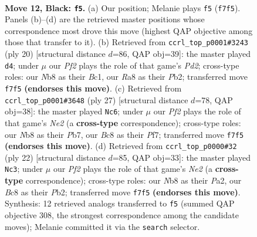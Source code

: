 \documentclass[11pt]{article}
\begin{document}
\clearpage

\begin{figure}[p]\centering
\begin{subfigure}{0.46\textwidth}\centering
\resizebox{\linewidth}{!}{%
\newchessgame
\chessboard[
  setfen={rnb2rk1/2pnqppp/pp2p3/3pP3/3P1P1P/8/PPP1N1P1/1R1QKBNR b - - 3 12},
  showmover=false,
  pgfstyle=straightmove, color=movearrow, markmove={f7-f5}
]}
\caption{}
\end{subfigure}\hfill
\begin{subfigure}{0.46\textwidth}\centering
\resizebox{\linewidth}{!}{%
\newchessgame
\chessboard[
  setfen={r2qk2r/1b1n1ppp/1pp1pn2/p7/P1Q5/R4NP1/1P1PPPBP/2B2RK1 w kq - 0 11},
  showmover=false,
  pgfstyle=straightmove, color=movearrow, markmove={d2-d4}
]}
\caption{}
\end{subfigure}
\\[4pt]
\begin{subfigure}{0.46\textwidth}\centering
\resizebox{\linewidth}{!}{%
\newchessgame
\chessboard[
  setfen={r3r1k1/1ppqnpbp/p2p1np1/8/3PP3/P4N1P/1P1N1PP1/R1BQR1K1 b - - 0 14},
  showmover=false,
  pgfstyle=straightmove, color=movearrow, markmove={e7-c6}
]}
\caption{}
\end{subfigure}\hfill
\begin{subfigure}{0.46\textwidth}\centering
\resizebox{\linewidth}{!}{%
\newchessgame
\chessboard[
  setfen={r1bq1rk1/1p1n1ppp/2pp1n2/p7/2PP4/N5P1/PP1QNPBP/R4RK1 w - - 0 12},
  showmover=false,
  pgfstyle=straightmove, color=movearrow, markmove={e2-c3}
]}
\caption{}
\end{subfigure}
\caption{\textbf{Move 12, Black: \texttt{f5}.} (a) Our position; Melanie plays \texttt{f5} (\texttt{f7f5}). Panels (b)--(d) are the retrieved master positions whose correspondence most drove this move (highest QAP objective among those that transfer to it). (b) Retrieved from \texttt{ccrl\_top\_p0001\#3243} (ply 20) [structural distance $d$=86, QAP obj=39]: the master played \texttt{d4}; under $\mu$ our \emph{Pf2} plays the role of that game's \emph{Pd2}; cross-type roles: our \emph{N}b8 as their \emph{B}c1, our \emph{R}a8 as their \emph{P}b2; transferred move \texttt{f7f5} \textbf{(endorses this move)}. (c) Retrieved from \texttt{ccrl\_top\_p0001\#3648} (ply 27) [structural distance $d$=78, QAP obj=38]: the master played \texttt{Nc6}; under $\mu$ our \emph{Pf2} plays the role of that game's \emph{Ne2} (a \textbf{cross-type} correspondence); cross-type roles: our \emph{N}b8 as their \emph{P}b7, our \emph{B}c8 as their \emph{P}f7; transferred move \texttt{f7f5} \textbf{(endorses this move)}. (d) Retrieved from \texttt{ccrl\_top\_p0000\#32} (ply 22) [structural distance $d$=85, QAP obj=33]: the master played \texttt{Nc3}; under $\mu$ our \emph{Pf2} plays the role of that game's \emph{Ne2} (a \textbf{cross-type} correspondence); cross-type roles: our \emph{N}b8 as their \emph{P}a2, our \emph{B}c8 as their \emph{P}b2; transferred move \texttt{f7f5} \textbf{(endorses this move)}. Synthesis: 12 retrieved analogs transferred to \texttt{f5} (summed QAP objective 308, the strongest correspondence among the candidate moves); Melanie committed it via the \texttt{search} selector.}
\label{fig:thought-m23}
\end{figure}
\end{document}
